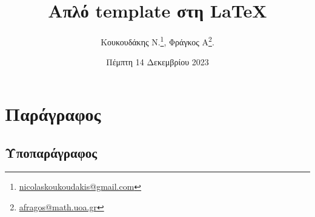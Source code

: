 \documentclass[A4]{article}
\begin{document}
	\title{\textbf{Απλό template στη \LaTeX}}
	\author{Κουκουδάκης Ν.\footnote{\href{mailto://nicolaskoukoudakis@gmail.com}{nicolaskoukoudakis@gmail.com}}, Φράγκος Α\footnote{\href{mailto://afragos@math.uoa.gr}{afragos@math.uoa.gr}}.}
	\date{Πέμπτη 14 Δεκεμβρίου 2023}
	\maketitle
	
	\renewcommand*\contentsname{\textbf{Περιεχόμενα}}
	\tableofcontents

\section{Παράγραφος}
\subsection{Υποπαράγραφος}
\end{document}
